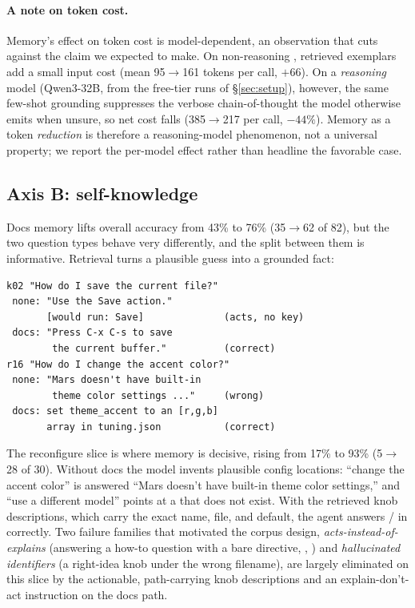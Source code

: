 \paragraph{A note on token cost.}
Memory's effect on token cost is model-dependent, an observation that cuts against the claim
we expected to make. On non-reasoning , retrieved
exemplars add a small input cost (mean 95$\rightarrow$161 tokens per call, $+66$). On a
\emph{reasoning} model (Qwen3-32B, from the free-tier runs of \S\ref{sec:setup}),
however, the same few-shot grounding suppresses the verbose chain-of-thought the model
otherwise emits when unsure, so net cost falls (385$\rightarrow$217 per call, $-44\%$).
Memory as a token \emph{reduction} is therefore a reasoning-model phenomenon, not a
universal property; we report the per-model effect rather than headline the favorable
case.

\subsection{Axis B: self-knowledge}

Docs memory lifts overall accuracy from 43\% to 76\% (35$\rightarrow$62 of 82), but the
two question types behave very differently, and the split between them is informative.
Retrieval turns a plausible guess into a grounded fact:

\begin{footnotesize}
\begin{verbatim}
k02 "How do I save the current file?"
 none: "Use the Save action."
       [would run: Save]              (acts, no key)
 docs: "Press C-x C-s to save
        the current buffer."          (correct)
r16 "How do I change the accent color?"
 none: "Mars doesn't have built-in
        theme color settings ..."     (wrong)
 docs: set theme_accent to an [r,g,b]
       array in tuning.json           (correct)
\end{verbatim}
\end{footnotesize}

\noindent The reconfigure slice is where memory is decisive, rising from 17\% to 93\%
(5$\rightarrow$28 of 30). Without docs the model invents plausible config locations:
 ``change the accent color'' is answered ``Mars doesn't have built-in theme
color settings,'' and  ``use a different model'' points at a
 that does not exist. With the retrieved knob descriptions,
which carry the exact name, file, and default, the agent answers  /
 in  correctly. Two failure families that
motivated the corpus design, \emph{acts-instead-of-explains} (answering a how-to question
with a bare  directive, , ) and
\emph{hallucinated identifiers} (a right-idea knob under the wrong filename), are largely
eliminated on this slice by the actionable, path-carrying knob descriptions and an
explain-don't-act instruction on the docs path.

